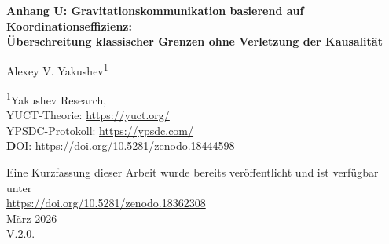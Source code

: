 \documentclass[12pt,a4paper]{article}
\newcommand{\Keff}{K_{\mathrm{eff}}}
\begin{document}
	
	\begin{titlepage}
		\begin{center}
			\vspace*{1cm}
			\Huge \textbf{Anhang U: Gravitationskommunikation basierend auf Koordinationseffizienz: \\ Überschreitung klassischer Grenzen ohne Verletzung der Kausalität}
			
			\vspace{1cm}
			\Large Alexey V. Yakushev\textsuperscript{1}
			
			\vspace{0.5cm}
			\large \textsuperscript{1}Yakushev Research, \\
			YUCT-Theorie: \url{https://yuct.org/}\\
			YPSDC-Protokoll: \url{https://ypsdc.com/}\\
			
			\vspace{2cm}
			\textbf DOI: \url{https://doi.org/10.5281/zenodo.18444598}\\
			
			\vspace{1cm}
			
			\vspace{0cm}
			\large 
			Eine Kurzfassung dieser Arbeit wurde bereits veröffentlicht und ist verfügbar unter\\ \url{https://doi.org/10.5281/zenodo.18362308}\\
			\vspace{1cm}
			März 2026 \\ \large V.2.0.
			
			\newpage
			\vspace{2cm}
			\begin{abstract}
				\noindent
				Wir schlagen ein neuartiges Konzept für die Fernkommunikation vor, das auf der Yakushev Unified Coordination Theory (YUCT) basiert. Indem wir das Gravitationsfeld als ein natürlich vorkommendes globales Wörterbuch behandeln, zeigen wir, dass kurze Indizes (gravitative Störungen) Zustände zwischen weit entfernten Beobachtern mit einer effektiven Effizienz \(\Keff\) koordinieren können, die formal die Lichtgeschwindigkeitsgrenze überschreitet, ohne jedoch die Kausalität zu verletzen. Der Schlüssel liegt in der Trennung von offline-Wörterbuchverteilung (dem bereits existierenden Gravitationsfeld) und online-Indexübertragung (einer Lichtgeschwindigkeits-Gravitationswelle). Gravitationswellen durchdringen Materie ohne Abschwächung und bieten einen erheblichen Vorteil gegenüber elektromagnetischen Signalen. Wir leiten die grundlegenden Gleichungen her, schätzen erreichbare Effizienzen ab und schlagen einen experimentellen Test mit hochpräzisen Gravimetern vor. Diese Arbeit eröffnet einen Weg zu einer neuen Klasse von Kommunikationssystemen, bei denen die Latenz eher durch lokale Verarbeitung als durch Entfernung bestimmt wird.
			\end{abstract}
			

\end{center}
\end{titlepage}
\end{document}
